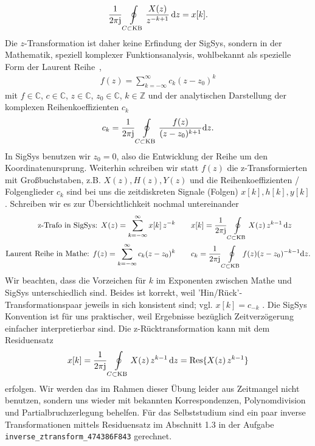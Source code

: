 \begin{align}
\frac{1}{2\pi \im} \oint\limits_{C \subset \text{KB}} \frac{X(z)}{z^{-k+1}} \, \fsd z
= x[k].
\end{align}
%
Die $z$-Transformation ist daher keine Erfindung der SigSys, sondern in der
Mathematik, speziell komplexer Funktionsanalysis, wohlbekannt als spezielle
Form der Laurent Reihe~\cite[S.\,56ff]{Wunsch1972}, \cite[Kap. 32.3]{Arens2022}
\begin{align}
f(z) = \sum_{k=-\infty}^{\infty} c_k (z - z_0)^k
\end{align}
mit $f\in\mathbb{C}$, $c\in\mathbb{C}$, $z\in\mathbb{C}$, $z_0\in\mathbb{C}$, $k\in\mathbb{Z}$
und der analytischen Darstellung der komplexen Reihenkoeffizienten $c_k$
\begin{align}
c_k = \frac{1}{2\pi\im}\oint\limits_{C \subset \text{KB}}
\frac{f(z)}{(z-z_0)^{k+1}}\fsd z.
\end{align}
%
In SigSys benutzen wir $z_0=0$, also die Entwicklung der Reihe um den
Koordinatenursprung.
%
Weiterhin schreiben wir statt $f(z)$ die z-Transformierten mit Großbuchstaben,
z.B. $X(z), H(z), Y(z)$ und die Reihenkoeffizienten / Folgenglieder $c_k$
sind bei uns die zeitdiskreten Signale (Folgen) $x[k], h[k], y[k]$.
%
Schreiben wir es zur Übersichtlichkeit nochmal untereinander
\begin{align}
\text{z-Trafo in SigSys:   } X(z) = \sum_{k=-\infty}^{\infty} x[k] \, z^{-k}\qquad
&x[k] = \frac{1}{2\pi \im} \oint\limits_{C \subset \text{KB}} X(z) \, z^{k-1} \, \fsd z\\
\text{Laurent Reihe in Mathe:   } f(z) = \sum_{k=-\infty}^{\infty} c_k (z - z_0)^k\qquad
&c_k = \frac{1}{2\pi\im}\oint\limits_{C \subset \text{KB}}
f(z) (z-z_0)^{-k-1}\fsd z.
\end{align}
Wir beachten, dass die Vorzeichen für $k$ im Exponenten zwischen Mathe und SigSys
unterschiedlich sind.
%
Beides ist korrekt, weil 'Hin/Rück'-Transformationspaar jeweils in sich
konsistent sind; vgl. $x[k] = c_{-k}$ \cite[S. 95]{Frey2008}.
%
Die SigSys Konvention ist für uns praktischer, weil Ergebnisse
bezüglich Zeitverzögerung einfacher interpretierbar sind.
%
Die z-Rücktransformation kann mit dem Residuensatz
\begin{align}
x[k] = \frac{1}{2\pi \im} \oint\limits_{C \subset \text{KB}} X(z) \, z^{k-1} \, \fsd z
= \text{Res}\{X(z) \, z^{k-1}\}
\end{align}
erfolgen.
%
Wir werden das im Rahmen dieser Übung leider
aus Zeitmangel nicht benutzen, sondern uns wieder mit bekannten Korrespondenzen,
Polynomdivision und Partialbruchzerlegung behelfen.
%
Für das Selbststudium sind ein paar inverse Transformationen mittels Residuensatz
im Abschnitt 1.3 in der Aufgabe \texttt{inverse\_ztransform\_474386F843}
gerechnet.


